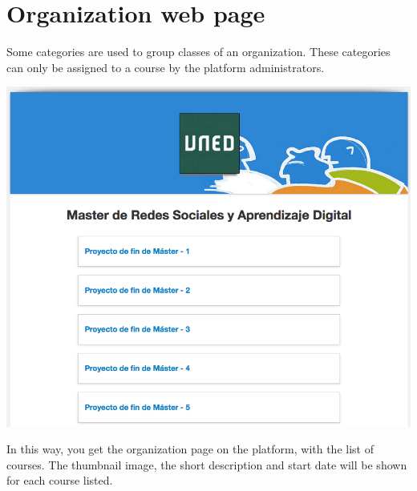 \documentclass[letterpaper,10pt,english]{sphinxmanual}
\begin{document}
\section{Organization web page}
\label{categories:organization-web-page}
Some categories are used to group classes of an organization.
These categories can only be assigned to a course by the platform administrators.


\includegraphics{5_categories-0b.png}

In this way, you get the organization page on the platform, with the list of courses.
The thumbnail image, the short description and start date will be shown for each course listed.



\renewcommand{\indexname}{Index}
\printindex
\end{document}
